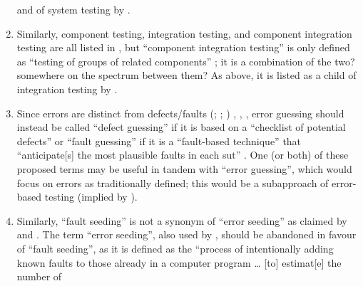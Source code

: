 \begin{enumerate}
          and of system testing by \citet[p.~23]{Firesmith2015}.
    \item %
          Similarly, component testing, integration testing, and component
          integration testing are all listed in \citep{IEEE2017}, but ``component
          integration testing'' is only defined as ``testing of groups of
          related components'' \citep[p.~82]{IEEE2017}; it is a combination of
          the two? somewhere on the spectrum between them? As above, it is
          listed as a child of integration testing by \citetISTQB{}.
    \item %
          Since errors are distinct from defects/faults \ifnotpaper
              (\citealp[pp.~128, 140]{IEEE2010}; \citealp[p.~12\=/3]{SWEBOK2024};
              \citealp[pp.~399--400]{vanVliet2000})\else
              \cite[p.~12\=/3]{SWEBOK2024}, \cite[pp.~128, 140]{IEEE2010},
              \cite[pp.~399--400]{vanVliet2000}\fi, error guessing should
          instead be called ``defect guessing'' if it is based on a ``checklist
          of potential defects'' \citep[p.~29]{IEEE2021} or ``fault guessing''
          if it is a ``fault-based technique'' \citep[p.~4\=/9]{SWEBOK2014}
          that ``anticipate[s] the most plausible faults in each \acs{sut}''
          \citep[p.~5\=/13]{SWEBOK2024}. One (or both) of these proposed terms
          may be useful in tandem with ``error guessing'', which would focus on
          errors as traditionally defined; this would be a subapproach of
          error-based testing (implied by \citealp[p.~399]{vanVliet2000}).
    \item %
          Similarly, ``fault seeding'' is not a synonym of ``error seeding''
          as claimed by \citet[p.~165]{IEEE2017} and
          \citet[p.~427]{vanVliet2000}. The term ``error seeding'', also
          used by \citet[p.~34]{Firesmith2015},
          should be abandoned in favour of ``fault seeding'', as it is defined
          as the ``process of intentionally adding known faults to those
          already in a computer program \dots{} [to] estimat[e] the number of

\end{enumerate}
